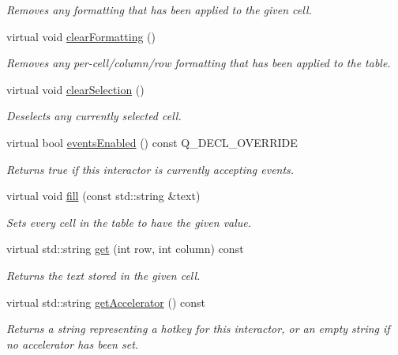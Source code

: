 \begin{DoxyCompactItemize}
\begin{DoxyCompactList}\small\item\em Removes any formatting that has been applied to the given cell. \end{DoxyCompactList}\item 
virtual void \mbox{\hyperlink{classGTable_a07ea41be0cdc43ffcd09898d3ae5c523}{clear\+Formatting}} ()
\begin{DoxyCompactList}\small\item\em Removes any per-\/cell/column/row formatting that has been applied to the table. \end{DoxyCompactList}\item 
virtual void \mbox{\hyperlink{classGTable_abd07e172ccec6823a88289c21124a367}{clear\+Selection}} ()
\begin{DoxyCompactList}\small\item\em Deselects any currently selected cell. \end{DoxyCompactList}\item 
virtual bool \mbox{\hyperlink{classGInteractor_ac05ba5b92e2e5146d416fe7f842a0969}{events\+Enabled}} () const Q\+\_\+\+D\+E\+C\+L\+\_\+\+O\+V\+E\+R\+R\+I\+DE
\begin{DoxyCompactList}\small\item\em Returns true if this interactor is currently accepting events. \end{DoxyCompactList}\item 
virtual void \mbox{\hyperlink{classGTable_a1ff40d0915f96652929cfb739bdd969f}{fill}} (const std\+::string \&text)
\begin{DoxyCompactList}\small\item\em Sets every cell in the table to have the given value. \end{DoxyCompactList}\item 
virtual std\+::string \mbox{\hyperlink{classGTable_aaa9971dcb7e1b082abd3b9010667f041}{get}} (int row, int column) const
\begin{DoxyCompactList}\small\item\em Returns the text stored in the given cell. \end{DoxyCompactList}\item 
virtual std\+::string \mbox{\hyperlink{classGInteractor_a69f8d23ed8f207fbecad99960776e942}{get\+Accelerator}} () const
\begin{DoxyCompactList}\small\item\em Returns a string representing a hotkey for this interactor, or an empty string if no accelerator has been set. \end{DoxyCompactList}\item 

\end{DoxyCompactItemize}
